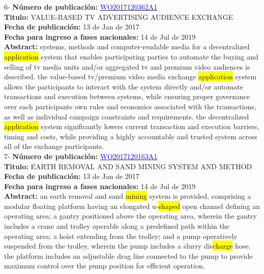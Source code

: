  \vspace{1cm}6- \textbf{Número de publicación:} \href{https://worldwide.espacenet.com/publicationDetails/biblio?DB=EPODOC&II=0&ND=3&adjacent=true&locale=en_EP&FT=D&date=20160331&CC=WO&NR=2017120362A1&KC=A1#}{\textcolor{blue}{WO2017120362A1}}\\ 
\textbf{Titulo:} VALUE-BASED TV ADVERTISING AUDIENCE EXCHANGE\\ 
 
\textbf{Fecha de publicación:} 13 de Jan de 2017\\ 
\textbf{Fecha para ingreso a fases nacionales:} 14 de Jul de 2019\\ 
\textbf{Abstract:} systems, methods and computer-readable media for a decentralized \colorbox{yellow}{application} system that enables participating parties to automate the buying and selling of tv media units and/or aggregated tv and premium video audiences is described. the value-based tv/premium video media exchange \colorbox{yellow}{application} system allows the participants to interact with the system directly and/or automate transactions and execution between systems, while ensuring proper governance over each participants own rules and economics associated with the transactions, as well as individual campaign constraints and requirements. the decentralized \colorbox{yellow}{application} system significantly lowers current transaction and execution barriers, timing and costs, while providing a highly accountable and trusted system across all of the exchange participants.\\ 
 

 \vspace{1cm}7- \textbf{Número de publicación:} \href{https://worldwide.espacenet.com/publicationDetails/biblio?DB=EPODOC&II=0&ND=3&adjacent=true&locale=en_EP&FT=D&date=20160331&CC=WO&NR=2017120163A1&KC=A1#}{\textcolor{blue}{WO2017120163A1}}\\ 
\textbf{Titulo:} EARTH REMOVAL AND SAND MINING SYSTEM AND METHOD\\ 
 
\textbf{Fecha de publicación:} 13 de Jan de 2017\\ 
\textbf{Fecha para ingreso a fases nacionales:} 14 de Jul de 2019\\ 
\textbf{Abstract:} an earth removal and sand \colorbox{yellow}{mining} system is provided, comprising a modular floating platform having an elongated u-\colorbox{yellow}{shaped} open channel defining an operating area; a gantry positioned above the operating area, wherein the gantry includes a crane and trolley operable along a predefined path within the operating area; a hoist extending from the trolley; and a pump operatively suspended from the trolley, wherein the pump includes a slurry dis\colorbox{yellow}{\colorbox{yellow}{charge}} hose. the platform includes an adjustable drag line connected to the pump to provide maximum control over the pump position for efficient operation.\\ 
 

